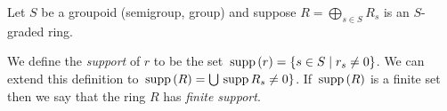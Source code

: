 \documentclass[12pt]{article}
\newcommand{\supp}{\,{\rm supp}\,}
\begin{document}
Let $S$ be a groupoid (semigroup, group) and suppose $R = \bigoplus_{s \in S}
R_{s}$ is an $S$- graded ring.

We define the {\em
support} of $r$ to be the set $\supp(r) = \{ s \in S \mid
r_{s} \neq 0 \}$. We can extend this definition to $\supp(R) = \bigcup \supp%
R_{s} \neq 0 \}$.  If $\supp(R)$ is a finite set then we say that the ring $R$ has {\em finite
support}.
\end{document}
